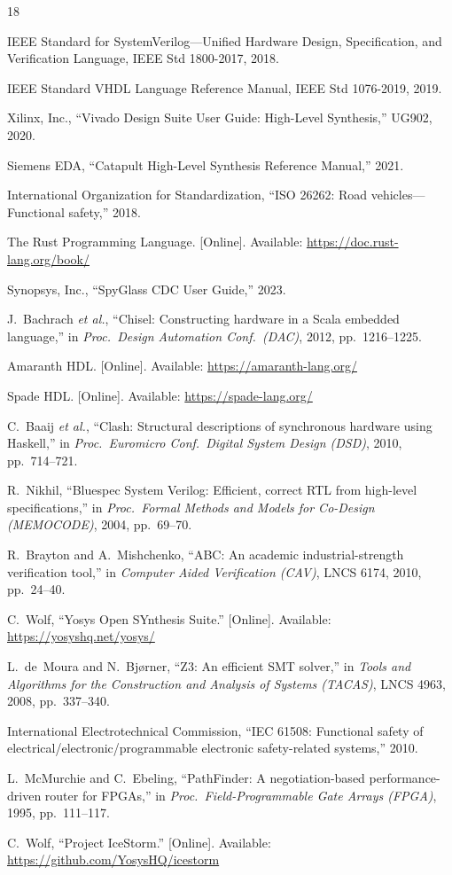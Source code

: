 \documentclass[conference]{IEEEtran}
\begin{document}
\begin{thebibliography}{18}

IEEE Standard for SystemVerilog---Unified Hardware Design, Specification, and Verification Language, IEEE Std 1800-2017, 2018.

IEEE Standard VHDL Language Reference Manual, IEEE Std 1076-2019, 2019.

Xilinx, Inc., ``Vivado Design Suite User Guide: High-Level Synthesis,'' UG902, 2020.

Siemens EDA, ``Catapult High-Level Synthesis Reference Manual,'' 2021.

International Organization for Standardization, ``ISO 26262: Road vehicles---Functional safety,'' 2018.

The Rust Programming Language. [Online]. Available: \url{https://doc.rust-lang.org/book/}

Synopsys, Inc., ``SpyGlass CDC User Guide,'' 2023.

J.~Bachrach \emph{et al.}, ``Chisel: Constructing hardware in a Scala embedded language,'' in \emph{Proc.\ Design Automation Conf.\ (DAC)}, 2012, pp.~1216--1225.

Amaranth HDL. [Online]. Available: \url{https://amaranth-lang.org/}

Spade HDL. [Online]. Available: \url{https://spade-lang.org/}

C.~Baaij \emph{et al.}, ``Clash: Structural descriptions of synchronous hardware using Haskell,'' in \emph{Proc.\ Euromicro Conf.\ Digital System Design (DSD)}, 2010, pp.~714--721.

R.~Nikhil, ``Bluespec System Verilog: Efficient, correct RTL from high-level specifications,'' in \emph{Proc.\ Formal Methods and Models for Co-Design (MEMOCODE)}, 2004, pp.~69--70.

R.~Brayton and A.~Mishchenko, ``ABC: An academic industrial-strength verification tool,'' in \emph{Computer Aided Verification (CAV)}, LNCS 6174, 2010, pp.~24--40.

C.~Wolf, ``Yosys Open SYnthesis Suite.'' [Online]. Available: \url{https://yosyshq.net/yosys/}

L.~de~Moura and N.~Bj{\o}rner, ``Z3: An efficient SMT solver,'' in \emph{Tools and Algorithms for the Construction and Analysis of Systems (TACAS)}, LNCS 4963, 2008, pp.~337--340.

International Electrotechnical Commission, ``IEC 61508: Functional safety of electrical/electronic/programmable electronic safety-related systems,'' 2010.

L.~McMurchie and C.~Ebeling, ``PathFinder: A negotiation-based performance-driven router for FPGAs,'' in \emph{Proc.\ Field-Programmable Gate Arrays (FPGA)}, 1995, pp.~111--117.

C.~Wolf, ``Project IceStorm.'' [Online]. Available: \url{https://github.com/YosysHQ/icestorm}

\end{thebibliography}
\end{document}
